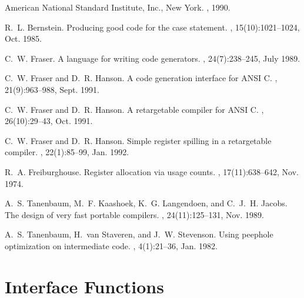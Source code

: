 %
\begin{thebibliography}{1}

American National Standard Institute, Inc., New York.
, 1990.

R.~L. Bernstein.
\newblock Producing good code for the case statement.
, 15(10):1021--1024, Oct.
  1985.

C.~W. Fraser.
\newblock A language for writing code generators.
, 24(7):238--245, July 1989.

C.~W. Fraser and D.~R. Hanson.
\newblock A code generation interface for {ANSI C}.
, 21(9):963--988, Sept. 1991.

C.~W. Fraser and D.~R. Hanson.
\newblock A retargetable compiler for {ANSI C}.
, 26(10):29--43, Oct. 1991.

C.~W. Fraser and D.~R. Hanson.
\newblock Simple register spilling in a retargetable compiler.
, 22(1):85--99, Jan. 1992.

R.~A. Freiburghouse.
\newblock Register allocation via usage counts.
, 17(11):638--642, Nov. 1974.

A.~S. Tanenbaum, M.~F. Kaashoek, K.~G. Langendoen, and C.~J.~H. Jacobs.
\newblock The design of very fast portable compilers.
, 24(11):125--131, Nov. 1989.

A.~S. Tanenbaum, H.~van Staveren, and J.~W. Stevenson.
\newblock Using peephole optimization on intermediate code.
,
  4(1):21--36, Jan. 1982.

\end{thebibliography}

\appendix

\section{Interface Functions}
\label{appendix:interface}

